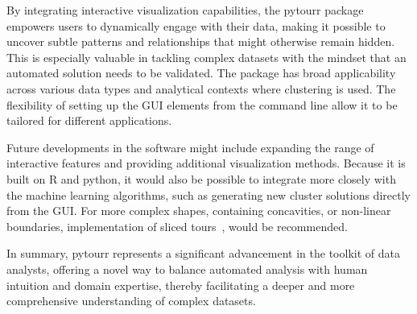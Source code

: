 \documentclass[article]{ajs}
\begin{document}
By integrating interactive visualization capabilities, the pytourr package empowers users to dynamically engage with their data, making it possible to uncover subtle patterns and relationships that might otherwise remain hidden. This is especially valuable in tackling complex datasets with the mindset that an automated solution needs to be validated. The package has broad applicability across various data types and analytical contexts where clustering is used. The flexibility of setting up the GUI elements from the command line allow it to be tailored for different applications.

Future developments in the software might include expanding the range of interactive features and providing additional visualization methods.  Because it is built on R and python, it would also be possible to integrate more closely with the machine learning algorithms, such as generating new cluster solutions directly from the GUI. For more complex shapes, containing concavities, or non-linear boundaries, implementation of sliced tours~\citep{Laa2020}, would be recommended.

In summary, pytourr represents a significant advancement in the toolkit of data analysts, offering a novel way to balance automated analysis with human intuition and domain expertise, thereby facilitating a deeper and more comprehensive understanding of complex datasets.


%

\end{document}

